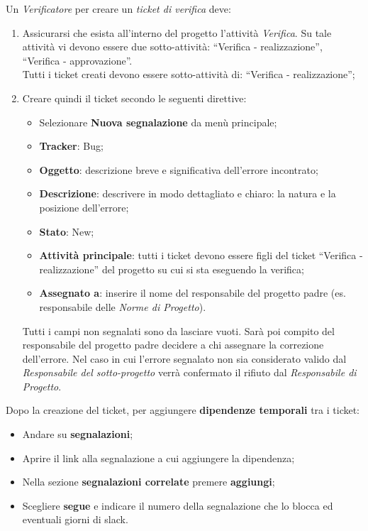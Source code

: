 Un \emph{Verificatore} per creare un \emph{ticket di verifica} deve: 
\begin{enumerate}
\item Assicurarsi che esista all’interno del progetto l’attività \emph{Verifica}.
Su tale attività vi devono essere due sotto-attività: “Verifica - realizzazione”, 
“Verifica - approvazione”.\\
Tutti i ticket creati devono essere sotto-attività di: “Verifica - realizzazione”; 
\item Creare quindi il ticket secondo le seguenti direttive: 
		\begin{itemize}
		
		
		\item Selezionare \textbf{Nuova segnalazione} da menù principale; 
		\item \textbf{Tracker}: Bug; 
		\item \textbf{Oggetto}: descrizione breve e significativa dell’errore incontrato; 
		\item \textbf{Descrizione}: descrivere in modo dettagliato e chiaro: la natura e la posizione dell’errore; 
		\item \textbf{Stato}: New; 
		\item \textbf{Attività principale}: tutti i ticket devono essere figli del ticket “Verifica - realizzazione” del progetto su cui si sta eseguendo la verifica; 
		\item \textbf{Assegnato a}: inserire il nome del responsabile del progetto padre (es. 
		responsabile delle \emph{Norme di Progetto}). 
		\end{itemize}
Tutti i campi non segnalati sono da lasciare vuoti. 
Sarà poi compito del responsabile del progetto padre decidere a chi assegnare la correzione dell’errore. Nel caso in cui l’errore segnalato non sia considerato valido dal 
\emph{Responsabile del sotto-progetto} verrà confermato il rifiuto dal \emph{Responsabile di Progetto}. 

\end{enumerate}




Dopo la creazione del ticket, per aggiungere \textbf{dipendenze temporali} tra i ticket:
\begin{itemize}
\item Andare su \textbf{segnalazioni}; 
\item Aprire il link alla segnalazione a cui aggiungere la dipendenza; 
\item Nella sezione \textbf{segnalazioni correlate} premere \textbf{aggiungi}; 
\item Scegliere \textbf{segue} e indicare il numero della segnalazione che lo blocca ed eventuali giorni di slack. 

\end{itemize} 


